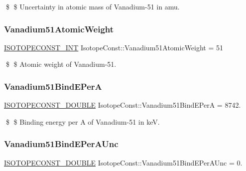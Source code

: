 \$ \$ Uncertainty in atomic mass of Vanadium-\/51 in amu. \mbox{\label{group___isotope_const-_vanadium-_v51_ga8dc37a40eecac2dd2a3170c313a720c2}} 
\subsubsection{\texorpdfstring{Vanadium51\+Atomic\+Weight}{Vanadium51AtomicWeight}}
{\footnotesize\ttfamily \mbox{\hyperlink{group___isotope_const-_macros_ga5f18360b3e99483a35c32d789e62621c}{I\+S\+O\+T\+O\+P\+E\+C\+O\+N\+S\+T\+\_\+\+I\+NT}} Isotope\+Const\+::\+Vanadium51\+Atomic\+Weight = 51}

\$ \$ Atomic weight of Vanadium-\/51. \mbox{\label{group___isotope_const-_vanadium-_v51_gaa13df059097b1d35b0f03b711a8fdf40}} 
\subsubsection{\texorpdfstring{Vanadium51\+Bind\+E\+PerA}{Vanadium51BindEPerA}}
{\footnotesize\ttfamily \mbox{\hyperlink{group___isotope_const-_macros_ga8f45a7272ce02c0b4c65c44636ed719a}{I\+S\+O\+T\+O\+P\+E\+C\+O\+N\+S\+T\+\_\+\+D\+O\+U\+B\+LE}} Isotope\+Const\+::\+Vanadium51\+Bind\+E\+PerA = 8742.}

\$ \$ Binding energy per A of Vanadium-\/51 in keV. \mbox{\label{group___isotope_const-_vanadium-_v51_ga2b42965741dc03532b4fc45934270e0c}} 
\subsubsection{\texorpdfstring{Vanadium51\+Bind\+E\+Per\+A\+Unc}{Vanadium51BindEPerAUnc}}
{\footnotesize\ttfamily \mbox{\hyperlink{group___isotope_const-_macros_ga8f45a7272ce02c0b4c65c44636ed719a}{I\+S\+O\+T\+O\+P\+E\+C\+O\+N\+S\+T\+\_\+\+D\+O\+U\+B\+LE}} Isotope\+Const\+::\+Vanadium51\+Bind\+E\+Per\+A\+Unc = 0.}

